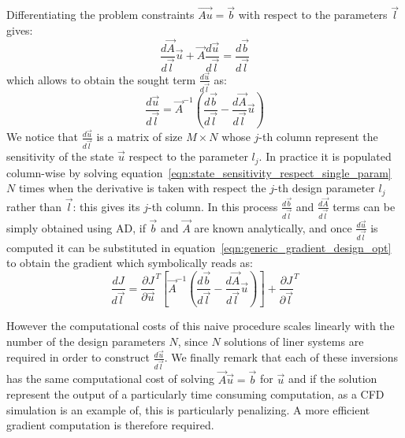 Differentiating the problem constraints $\vec{Au} = \vec{b}$ with respect to the parameters $\vec{l}$ gives:
\begin{equation}
	\frac{d\vec{A}}{d\vec{l}} \vec{u} + \vec{A} \frac{d\vec{u}}{d\vec{l}} = \frac{d\vec{b}}{d\vec{l}}
\end{equation}
which allows to obtain the sought term $\frac{d\vec{u}}{d\vec{l}}$ as:
\begin{equation}
	\label{eqn:state_sensitivity_respect_single_param}
	\frac{d\vec{u}}{d\vec{l}} = \vec{A}^{-1} \left( \frac{d\vec{b}}{d\vec{l}} - \frac{d\vec{A}}{d\vec{l}}\vec{u} \right)
\end{equation}
We notice that $\frac{d\vec{u}}{d\vec{l}}$ is a matrix of size $M \times N$ whose $j$-th column represent the sensitivity of the state $\vec{u}$ respect to the parameter $l_j$. 
In practice it is populated column-wise by solving equation~\eqref{eqn:state_sensitivity_respect_single_param} $N$ times when the derivative is taken with respect the $j$-th design parameter $l_j$ rather than $\vec{l}$: this gives its $j$-th column. In this process $\frac{d\vec{b}}{d\vec{l}}$ and $\frac{d\vec{A}}{d\vec{l}}$ terms can be simply obtained using AD, if $\vec{b}$ and $\vec{A}$ are known analytically, and once $\frac{d\vec{u}}{d\vec{l}}$ is computed it can be substituted in equation~\eqref{eqn:generic_gradient_design_opt} to obtain the gradient which symbolically reads as:
\begin{equation}
	\label{eqn:generic_gradient_design_opt_naive}
	\frac{dJ}{d\vec{l}} = \frac{\partial J}{\partial \vec{u}}^T \left[ \vec{A}^{-1} \left( \frac{d\vec{b}}{d\vec{l}} - \frac{d\vec{A}}{d\vec{l}}\vec{u} \right) \right]  + \frac{\partial J}{\partial \vec{l}}^T
\end{equation}

However the computational costs of this naive procedure scales linearly with the number of the design parameters $N$, since $N$ solutions of liner systems are required in order to construct $\frac{d\vec{u}}{d\vec{l}}$. We finally remark that each of these inversions has the same computational cost of solving $\vec{A} \vec{u}= \vec{b}$ for $\vec{u}$ and if the solution represent the output of a particularly time consuming computation, as a CFD simulation is an example of, this is particularly penalizing. A more efficient gradient computation is therefore required.

